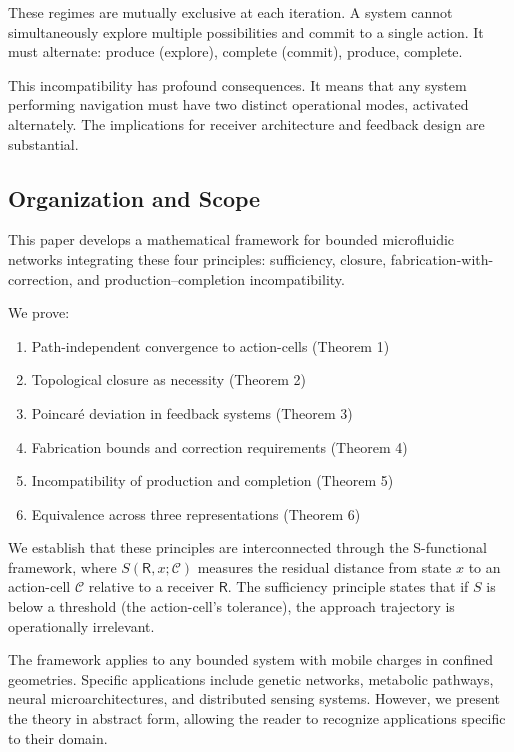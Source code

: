 \documentclass[twocolumn,11pt,a4paper]{article}
\newcommand{\Cell}{\mathcal{C}}
\newcommand{\receiver}{\mathsf{R}}
\begin{document}
These regimes are mutually exclusive at each iteration. A system cannot simultaneously explore multiple possibilities and commit to a single action. It must alternate: produce (explore), complete (commit), produce, complete.

This incompatibility has profound consequences. It means that any system performing navigation must have two distinct operational modes, activated alternately. The implications for receiver architecture and feedback design are substantial.

\subsection{Organization and Scope}

This paper develops a mathematical framework for bounded microfluidic networks integrating these four principles: sufficiency, closure, fabrication-with-correction, and production--completion incompatibility.

We prove:
\begin{enumerate}[label=(\arabic*),leftmargin=*]
\item Path-independent convergence to action-cells (Theorem 1)
\item Topological closure as necessity (Theorem 2)
\item Poincar\'{e} deviation in feedback systems (Theorem 3)
\item Fabrication bounds and correction requirements (Theorem 4)
\item Incompatibility of production and completion (Theorem 5)
\item Equivalence across three representations (Theorem 6)
\end{enumerate}

We establish that these principles are interconnected through the S-functional framework, where $S(\receiver, x; \Cell)$ measures the residual distance from state $x$ to an action-cell $\Cell$ relative to a receiver $\receiver$. The sufficiency principle states that if $S$ is below a threshold (the action-cell's tolerance), the approach trajectory is operationally irrelevant.

The framework applies to any bounded system with mobile charges in confined geometries. Specific applications include genetic networks, metabolic pathways, neural microarchitectures, and distributed sensing systems. However, we present the theory in abstract form, allowing the reader to recognize applications specific to their domain.
\end{document}
